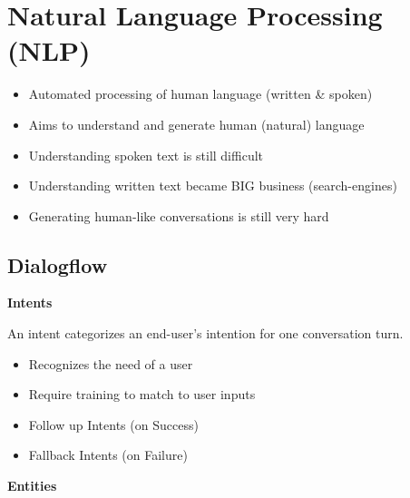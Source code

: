 \section{Natural Language Processing (NLP)}
\begin{itemize}
    \item Automated processing of human language (written \& spoken)
    \item Aims to understand and generate human (natural) language
    \item Understanding spoken text is still difficult
    \item Understanding written text became BIG business (search-engines)
    \item Generating human-like conversations is still very hard
\end{itemize}

\subsection{Dialogflow}
\textbf{Intents}

An intent categorizes an end-user's intention for one conversation turn.
\begin{itemize}
    \item Recognizes the need of a user
    \item Require training to match to user inputs
    \item Follow up Intents (on Success)
    \item Fallback Intents (on Failure)
\end{itemize}
\vspace{10pt}
\textbf{Entities}

